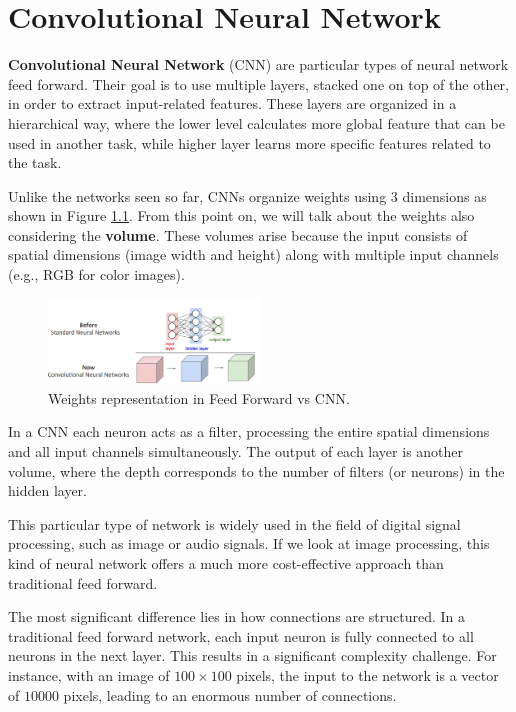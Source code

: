 \chapter{Convolutional Neural Network}
\textbf{Convolutional Neural Network} (CNN) are particular types of neural network
feed forward. Their goal is to use multiple layers, stacked one on top of the other,
in order to extract input-related features. These layers are organized in a
hierarchical way, where the lower level calculates more global feature that can
be used in another task, while higher layer learns more specific features related
to the task.

Unlike the networks seen so far, CNNs organize weights using 3 dimensions as shown
in Figure \ref{fig:weights}. From this point on, we will talk about the weights
also considering the \textbf{volume}. These volumes arise because the input
consists of spatial dimensions (image width and height) along with multiple input
channels (e.g., RGB for color images).

\begin{figure}[!ht]
    \centering
    \includegraphics[width=0.5\textwidth]{img/CNN/weights.png}
    \caption{Weights representation in Feed Forward vs CNN.}
    \label{fig:weights}
\end{figure}

In a CNN each neuron acts as a filter, processing the entire spatial dimensions
and all input channels simultaneously. The output of each layer is another volume,
where the depth corresponds to the number of filters (or neurons) in the hidden
layer.

This particular type of network is widely used in the field of digital signal
processing, such as image or audio signals. If we look at image processing, this
kind of neural network offers a much more cost-effective approach than traditional
feed forward.

The most significant difference lies in how connections are structured. In a
traditional feed forward network, each input neuron is fully connected to all
neurons in the next layer. This results in a significant complexity challenge.
For instance, with an image of $100 \times 100$ pixels, the input to the network
is a vector of $10000$ pixels, leading to an enormous number of connections.


